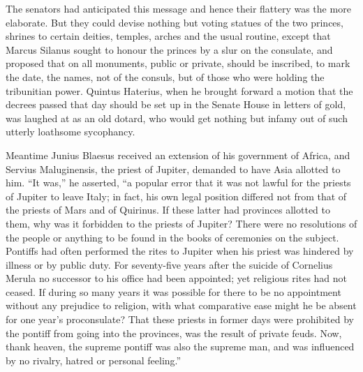 
The senators had anticipated this message and hence their flattery was the more elaborate. But they could devise nothing but voting statues of the two princes, shrines to certain deities, temples, arches and the usual routine, except that Marcus Silanus sought to honour the princes by a slur on the consulate, and proposed that on all monuments, public or private, should be inscribed, to mark the date, the names, not of the consuls, but of those who were holding the tribunitian power. Quintus Haterius, when he brought forward a motion that the decrees passed that day should be set up in the Senate House in letters of gold, was laughed at as an old dotard, who would get nothing but infamy out of such utterly loathsome sycophancy.


Meantime Junius Blaesus received an extension of his government of Africa, and Servius Maluginensis, the priest of Jupiter, demanded to have Asia allotted to him. ``It was,'' he asserted, ``a popular error that it was not lawful for the priests of Jupiter to leave Italy; in fact, his own legal position differed not from that of the priests of Mars and of Quirinus. If these latter had provinces allotted to them, why was it forbidden to the priests of Jupiter? There were no resolutions of the people or anything to be found in the books of ceremonies on the subject. Pontiffs had often performed the rites to Jupiter when his priest was hindered by illness or by public duty. For seventy-five years after the suicide of Cornelius Merula no successor to his office had been appointed; yet religious rites had not ceased. If during so many years it was possible for there to be no appointment without any prejudice to religion, with what comparative ease might he be absent for one year's proconsulate? That these priests in former days were prohibited by the pontiff from going into the provinces, was the result of private feuds. Now, thank heaven, the supreme pontiff was also the supreme man, and was influenced by no rivalry, hatred or personal feeling.''


